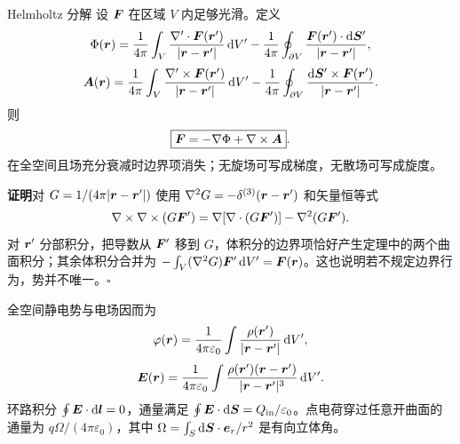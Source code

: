 \begin{advtheorem}{Helmholtz 分解}\label{advA4:thm:helmholtz}
设 $\bm{F}$ 在区域 $V$ 内足够光滑。定义
\[
 \Phi(\bm{r})=\frac1{4\pi}\int_V
 \frac{\nabla'\cdot\bm{F}(\bm{r}')}{|\bm{r}-\bm{r}'|}\mathop{}\!\mathrm d V'
 -\frac1{4\pi}\oint_{\partial V}
 \frac{\bm{F}(\bm{r}')\cdot\mathop{}\!\mathrm d\bm{S}'}{|\bm{r}-\bm{r}'|},
\]
\[
 \bm{A}(\bm{r})=\frac1{4\pi}\int_V
 \frac{\nabla'\times\bm{F}(\bm{r}')}{|\bm{r}-\bm{r}'|}\mathop{}\!\mathrm d V'
 -\frac1{4\pi}\oint_{\partial V}
 \frac{\mathop{}\!\mathrm d\bm{S}'\times\bm{F}(\bm{r}')}{|\bm{r}-\bm{r}'|}.
\]
则
\[
 \boxed{\bm{F}=-\nabla\Phi+\nabla\times\bm{A}}.
\]
在全空间且场充分衰减时边界项消失；无旋场可写成梯度，无散场可写成旋度。
\end{advtheorem}
\noindent\textbf{证明}\quad 对 $G=1/(4\pi|\bm{r}-\bm{r}'|)$ 使用
$\nabla^2G=-\delta^{(3)}(\bm{r}-\bm{r}')$ 和矢量恒等式
\[
 \nabla\times\nabla\times(G\bm{F}')
 =\nabla[\nabla\cdot(G\bm{F}')]-\nabla^2(G\bm{F}').
\]
对 $\bm{r}'$ 分部积分，把导数从 $\bm{F}'$ 移到 $G$，体积分的边界项恰好产生定理中的两个曲面积分；其余体积分合并为
$-\int_V(\nabla^2G)\bm{F}'\mathop{}\!\mathrm d V'=\bm{F}(\bm{r})$。这也说明若不规定边界行为，势并不唯一。\hfill$\square$

全空间静电势与电场因而为
\[
 \varphi(\bm{r})=\frac1{4\pi\varepsilon_0}
 \int\frac{\rho(\bm{r}')}{|\bm{r}-\bm{r}'|}\mathop{}\!\mathrm d V',
\]
\[
 \bm{E}(\bm{r})=\frac1{4\pi\varepsilon_0}
 \int\frac{\rho(\bm{r}')(\bm{r}-\bm{r}')}{|\bm{r}-\bm{r}'|^3}\mathop{}\!\mathrm d V'.
\]
环路积分 $\oint\bm{E}\cdot\mathop{}\!\mathrm d\bm{l}=0$，通量满足
$\oint\bm{E}\cdot\mathop{}\!\mathrm d\bm{S}=Q_{\rm in}/\varepsilon_0$。点电荷穿过任意开曲面的通量为
$q\Omega/(4\pi\varepsilon_0)$，其中
$\Omega=\int_S\mathop{}\!\mathrm d\bm{S}\cdot\bm{e}_r/r^2$ 是有向立体角。

